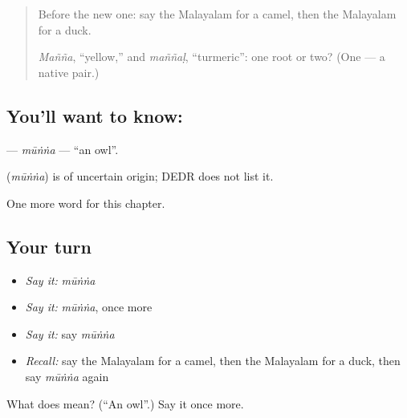 \label{lesson:ML-C162-munna}



\begin{quote}
Before the new one: say the Malayalam for a camel, then the Malayalam for a duck.

\emph{Mañña}, \textquotedblleft{}yellow,\textquotedblright{} and \emph{maññaḷ}, \textquotedblleft{}turmeric\textquotedblright{}: one root or two? (One — a native pair.)
\end{quote}

\subsection*{You'll want to know: }
\textbf{} — \emph{mūṅṅa} — \textquotedblleft{}an owl\textquotedblright{}.

\begin{cousinweb}
\textbf{} (\emph{mūṅṅa}) is of uncertain origin; DEDR does not list it.
\end{cousinweb}

\begin{grammarlens}[title={What you've built}]
One more word for this chapter.
\end{grammarlens}

\subsection*{Your turn}
\begin{itemize}
\raggedright
  \item \emph{Say it:} \emph{mūṅṅa}
  \item \emph{Say it:} \emph{mūṅṅa}, once more
  \item \emph{Say it:} say \emph{mūṅṅa}
  \item \emph{Recall:} say the Malayalam for a camel, then the Malayalam for a duck, then say \emph{mūṅṅa} again
\end{itemize}

\begin{tcolorbox}[breakable,colback=teal!4,colframe=teal!35!black,title={Before you move on}]
What does  mean? (\textquotedblleft{}An owl\textquotedblright{}.) Say it once more.
\end{tcolorbox}
